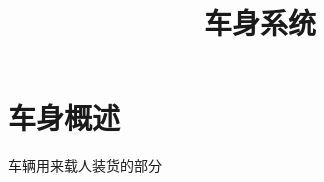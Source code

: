 
\graphicspath{{../img/}}
\title{车身系统}
\author{}
\date{}

\setlength{\parskip}{0em}	%
\setlength{\parindent}{2em} %
\setlength{\baselineskip}{20pt}	%
\selectfont	%
\setlength{\lineskip}{10pt}		%
\setlength{\lineskiplimit}{10pt}	%
\abovedisplayshortskip=0pt	%
\belowdisplayshortskip=0pt
\abovedisplayskip=0pt	%
\belowdisplayskip=0pt
\renewcommand{\arraystretch}{1.5}

\maketitle
\section{车身概述}
车辆用来载人装货的部分
